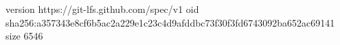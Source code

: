 version https://git-lfs.github.com/spec/v1
oid sha256:a357343e8cf6b5ac2a229e1c23c4d9afddbc73f30f3fd6743092ba652ac69141
size 6546
